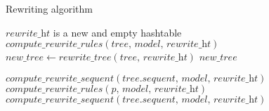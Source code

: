 \documentclass{article}
\begin{document}
\begin{algorithm}
  \caption{Rewriting algorithm}
  \begin{algorithmic}[1]
    \State $\textit{rewrite\_ht}$ is a new and empty hashtable
    \State $\textit{compute\_rewrite\_rules}\left(\textit{tree, model, rewrite\_ht}\right)$
    \State $\textit{new\_tree} \gets \textit{rewrite\_tree}\left(\textit{tree, rewrite\_ht}\right)$
    \State \Return $\textit{new\_tree}$
    \EndFunction
    \State

     \State $\textit{compute\_rewrite\_sequent}\left(\textit{tree.sequent, model, rewrite\_ht}\right)$
    \Else
      \State $\textit{compute\_rewrite\_rules}\left(\textit{p, model, rewrite\_ht}\right)$
      \EndFor
      \State $\textit{compute\_rewrite\_sequent}\left(\textit{tree.sequent, model, rewrite\_ht}\right)$
    \EndIf
    \EndFunction
    \State


\end{algorithmic}
\end{algorithm}
\end{document}
